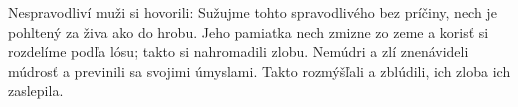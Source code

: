 Nespravodliví muži si hovorili:
Sužujme tohto spravodlivého bez príčiny, nech je pohltený za živa ako do hrobu. Jeho pamiatka nech zmizne zo zeme a korisť si rozdelíme podľa lósu; takto si nahromadili zlobu.
\versseparator 
Nemúdri a zlí znenávideli múdrosť a previnili sa svojimi úmyslami.
\versseparator
Takto rozmýšľali a zblúdili, ich zloba ich zaslepila.
